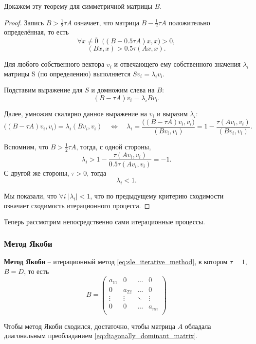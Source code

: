 \documentclass{article}
\begin{document}
Докажем эту теорему для симметричной матрицы $B$.

\begin{proof}
	Запись $B>\frac{1}{2}\tau A$ означает, что матрица $B-\frac{1}{2}\tau A$
	положительно определённая, то есть
	\[\forall x\ne\overline{0}\;\; \big((B-0.5\tau A)x,x\big)>0,\]
	\[(Bx,x)>0.5\tau(Ax,x).\]

	Для любого собственного вектора $v_i$ и отвечающего ему собственного
	значения $\lambda_i$ матрицы S (по определению) выполняется
	$Sv_i=\lambda_iv_i$.

	Подставим выражение для $S$ и домножим слева на $B$:
	\[(B-\tau A)v_i=\lambda_iBv_i.\]

	Далее, умножим скалярно данное выражение на $v_i$ и выразим $\lambda_i$:
	\[\big((B-\tau A)v_i, v_i\big)=\lambda_i(Bv_i,v_i)\quad\Leftrightarrow
	\quad\lambda_i=\frac{\big((B-\tau A)v_i, v_i\big)}{(Bv_i,v_i)}=
	1-\frac{\tau(Av_i, v_i)}{(Bv_i,v_i)}.\]

	Вспомним, что $B>\frac{1}{2}\tau A$, тогда, с одной стороны,
	\[\lambda_i>1-\frac{\tau(Av_i, v_i)}{0.5\tau(Av_i, v_i)}=-1.\]
	С другой же стороны, $\tau>0$, тогда
	\[\lambda_i<1.\]

	Мы показали, что $\forall i\; |\lambda_i|<1$, что по предыдущему
	критерию сходимости означает сходимость итерационного процесса.
\end{proof}

Теперь рассмотрим непосредственно сами итерационные процессы.
\subsubsection{Метод Якоби}
\begin{define}
	\textbf{Метод Якоби} -- итерационный метод
	\eqref{eq:sle_iterative_method}, в котором $\tau=1$, $B=D$, то есть
	\[B=
		\begin{pmatrix}
			a_{11}	& 0	& ...	& 0 \\
			0	& a_{22}& ...	& 0 \\
			\vdots	& \vdots&\ddots &\vdots \\
			0	& 0	& ...	& a_{nn} \\
		\end{pmatrix}
	\]
\end{define}

\begin{theorem}
\label{eq:jacobi_method_convergence_cond}
	Чтобы метод Якоби сходился, достаточно, чтобы матрица $A$
	обладала диагональным преобладанием
	\eqref{eq:diagonally_dominant_matrix}.
\end{theorem}
\end{document}
